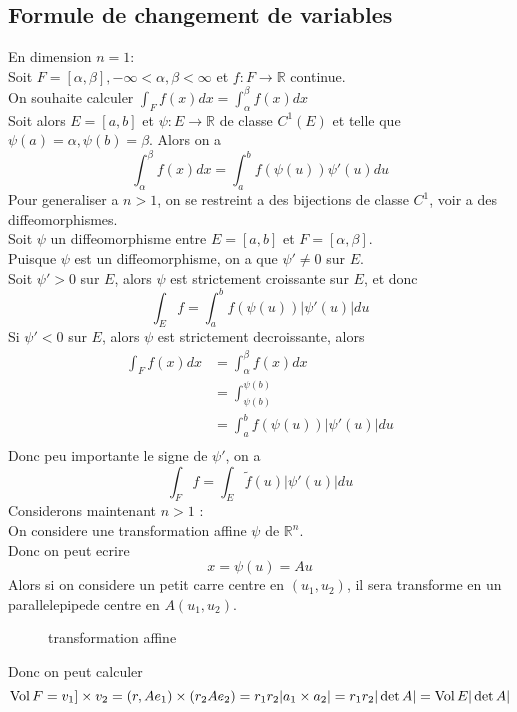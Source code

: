\documentclass[../main.tex]{subfiles}
\begin{document}
\subsection{Formule de changement de variables}
En dimension $n=1$:\\
Soit $F = [ \alpha,\beta] , - \infty  < \alpha, \beta< \infty $ et $f: F \to \mathbb{R}$ continue.\\
On souhaite calculer $\int_F f( x) dx= \int_{ \alpha }^{ \beta }f( x) dx$\\
Soit alors $E = [ a,b] $ et $\psi: E \to \mathbb{R}$ de classe $C^{1}( E) $ et telle que $\psi( a) =\alpha, \psi( b) = \beta$. Alors on a
\[ 
	\int_{ \alpha }^{ \beta }f( x) dx = \int_{ a }^{ b } f( \psi( u) ) \psi'( u) du
\]
Pour generaliser a $n>1$, on se restreint a des bijections de classe $C^{1}$, voir a des diffeomorphismes.\\
Soit $\psi$ un diffeomorphisme entre $E = [ a,b] $ et $F= [ \alpha,\beta] $.\\
Puisque $\psi$ est un diffeomorphisme, on a que $\psi' \neq 0$ sur $E$.\\
Soit $\psi'>0$ sur $E$, alors $\psi$ est strictement croissante sur $E$, et donc
\[ 
	\int_{ E }^{  }f = \int_{ a }^{ b } f( \psi( u) ) |\psi'( u) | du
\]
Si $\psi'< 0$ sur $E$, alors $\psi$ est strictement decroissante, alors
\begin{align*}
	\int_{ F }^{  } f( x)  dx &= \int_{ \alpha }^{ \beta } f( x) dx\\
			 &= \int_{ \psi( b)  }^{ \psi( b)  }\\
			 &= \int_{ a }^{ b } f( \psi( u) ) |\psi'( u) | du\\
\end{align*}
Donc peu importante le signe de $\psi'$, on a 
\[ 
	\int_{ F }^{  } f = \int_{E} \tilde f ( u)  | \psi'( u) |du
\]
Considerons maintenant $n>1$ :\\
On considere une transformation affine $\psi $ de $ \mathbb{R}^n$.\\
Donc on peut ecrire
\[ 
	x= \psi( u) = Au
\]
Alors si on considere un petit carre centre en $( u_1,u_2) $, il sera transforme en un parallelepipede centre en $A( u_1,u_2) $.
\begin{figure}[H]
    \centering
    \caption{transformation affine}
    \label{fig:transformation-affine}
\end{figure}
Donc on peut calculer 
\[ 
	\operatorname*{Vol} F = v_1]\times v_2 = ( r, Ae_1) \times ( r_2A e_2) = r_1 r_2 |a_1\times a_2| = r_1 r_2 | \det A| = \operatorname*{Vol} E | \det A|
\]
\end{document}
